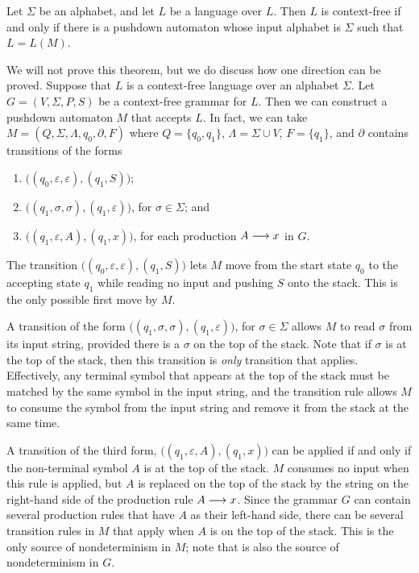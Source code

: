 \begin{theorem}
Let $\Sigma$ be an alphabet, and let $L$ be a language over $L$.  Then
$L$ is context-free if and only if there is a pushdown automaton whose
input alphabet is $\Sigma$ such that $L=L(M)$.
\end{theorem}

We will not prove this theorem, but we do discuss how one direction can
be proved.  Suppose that $L$ is a context-free language over an alphabet
$\Sigma$.  Let $G=(V,\Sigma,P,S)$ be a context-free grammar for $L$.
Then we can construct a pushdown automaton $M$ that accepts $L$.  In fact,
we can take $M=(Q,\Sigma,\Lambda,q_0,\partial,F)$ where
$Q=\{q_0,q_1\}$, $\Lambda=\Sigma\cup V$, $F=\{q_1\}$, and
$\partial$ contains transitions of the forms

\begin{enumerate}
\item $\big((q_0,\varepsilon,\varepsilon),(q_1,S)\big)$;
\item $\big((q_1,\sigma,\sigma),(q_1,\varepsilon)\big)$, for $\sigma\in\Sigma$; and
\item $\big((q_1,\varepsilon,A),(q_1,x)\big)$, for each production $A\longrightarrow x$ in $G$.
\end{enumerate}

The transition $\big((q_0,\varepsilon,\varepsilon),(q_1,S)\big)$ lets $M$
move from the start state $q_0$ to the accepting state $q_1$ while reading
no input and pushing $S$ onto the stack.  This is the only possible first move
by $M$.  

A transition of the form $\big((q_1,\sigma,\sigma),(q_1,\varepsilon)\big)$, for $\sigma\in\Sigma$
allows $M$ to read $\sigma$ from its input string, provided there is a $\sigma$
on the top of the stack.  Note that if $\sigma$ is at the top of the stack, then this
transition is \emph{only} transition that applies.  Effectively, any terminal symbol
that appears at the top of the stack must be matched by the same symbol in the
input string, and the transition rule allows $M$ to consume the symbol from the
input string and remove it from the stack at the same time.

A transition of the third form, $\big((q_1,\varepsilon,A),(q_1,x)\big)$ can
be applied if and only if the non-terminal symbol $A$ is at the top of
the stack.  $M$ consumes no input when this rule is applied, but $A$ is
replaced on the top of the stack by the string on the right-hand
side of the production rule $A\longrightarrow x$.  Since the grammar $G$ can
contain several production rules that have $A$ as their left-hand side,
there can be several transition rules in $M$ that apply when $A$ is on the
top of the stack.  This is the only source of nondeterminism in $M$; note
that is also the source of nondeterminism in $G$.

